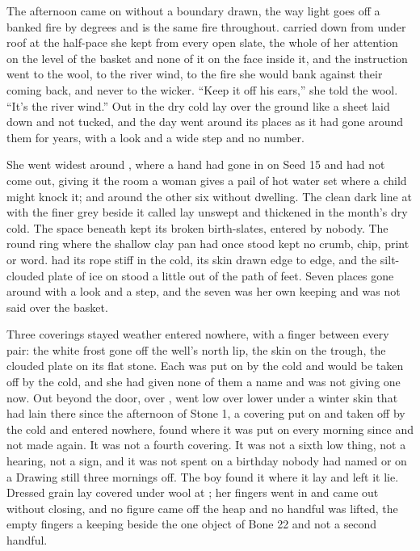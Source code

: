 The afternoon came on without a boundary drawn, the way light goes off a banked fire by degrees and is the same fire throughout.  carried  down from under  roof at the half-pace she kept from every open slate, the whole of her attention on the level of the basket and none of it on the face inside it, and the instruction went to the wool, to the river wind, to the fire she would bank against their coming back, and never to the wicker. “Keep it off his ears,” she told the wool. “It's the river wind.” Out in  the dry cold lay over the ground like a sheet laid down and not tucked, and the day went around its places as it had gone around them for years, with a look and a wide step and no number.

She went widest around , where a hand had gone in on Seed 15 and had not come out, giving it the room a woman gives a pail of hot water set where a child might knock it; and around the other six without dwelling. The clean dark line at  with the finer grey beside it called  lay unswept and thickened in the month's dry cold. The space beneath  kept its broken birth-slates, entered by nobody. The round ring where the shallow clay pan had once stood kept no crumb, chip, print or word.  had its rope stiff in the cold,  its skin drawn edge to edge, and the silt-clouded plate of ice on  stood a little out of the path of feet. Seven places gone around with a look and a step, and the seven was her own keeping and was not said over the basket.

Three coverings stayed weather entered nowhere, with a finger between every pair: the white frost gone off the well's north lip, the skin on the trough, the clouded plate on its flat stone. Each was put on by the cold and would be taken off by the cold, and she had given none of them a name and was not giving one now. Out beyond the door, over ,  went low over lower under a winter skin that had lain there since the afternoon of Stone 1, a covering put on and taken off by the cold and entered nowhere, found where it was put on every morning since and not made again. It was not a fourth covering. It was not a sixth low thing, not a hearing, not a sign, and it was not spent on a birthday nobody had named or on a Drawing still three mornings off. The boy found it where it lay and left it lie. Dressed grain lay covered under wool at ; her fingers went in and came out without closing, and no figure came off the heap and no handful was lifted, the empty fingers a keeping beside the one object of Bone 22 and not a second handful.

